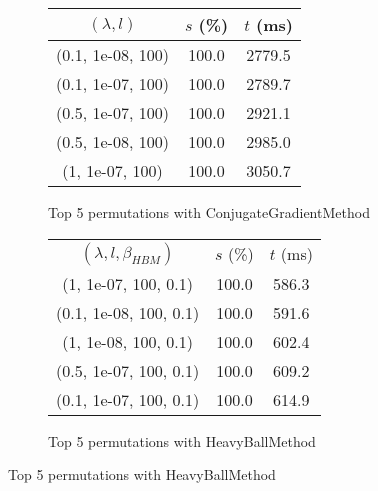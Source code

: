 \begin{figure}[H]
{\begin{subfigure}[ht]{.6\textwidth}
\begin{tabular}{|c|c|c|}
\hline
\rowcolor{gray!25}
$(\lambda,l)$ & $s$ (\%) & $t$ (ms) \\
\hline
(0.1, 1e-08, 100) & 100.0 & 2779.5 \\
(0.1, 1e-07, 100) & 100.0 & 2789.7 \\
(0.5, 1e-07, 100) & 100.0 & 2921.1 \\
(0.5, 1e-08, 100) & 100.0 & 2985.0 \\
(1, 1e-07, 100) & 100.0 & 3050.7 \\
\hline
\end{tabular}
\caption{Top 5 permutations with ConjugateGradientMethod}
\label{subfig:param_comp_NegativeEntropy_ConjugateGradientMethod_NewtonsSearch}
\end{subfigure}
\hfill
\begin{subfigure}[ht]{.6\textwidth}
\centering
{}
\begin{tabular}{|c|c|c|}
\hline
\rowcolor{gray!25}
\multicolumn{3}{|c|}{HeavyBallMethod} \\
\hline
\rowcolor{gray!25}
$(\lambda,l,\beta_{HBM})$ & $s$ (\%) & $t$ (ms) \\
\hline
(1, 1e-07, 100, 0.1) & 100.0 & 586.3 \\
(0.1, 1e-08, 100, 0.1) & 100.0 & 591.6 \\
(1, 1e-08, 100, 0.1) & 100.0 & 602.4 \\
(0.5, 1e-07, 100, 0.1) & 100.0 & 609.2 \\
(0.1, 1e-07, 100, 0.1) & 100.0 & 614.9 \\
\hline
\end{tabular}
\caption{Top 5 permutations with HeavyBallMethod}
\label{subfig:param_comp_NegativeEntropy_HeavyBallMethod_NewtonsSearch}
\end{subfigure}
}
\end{figure}